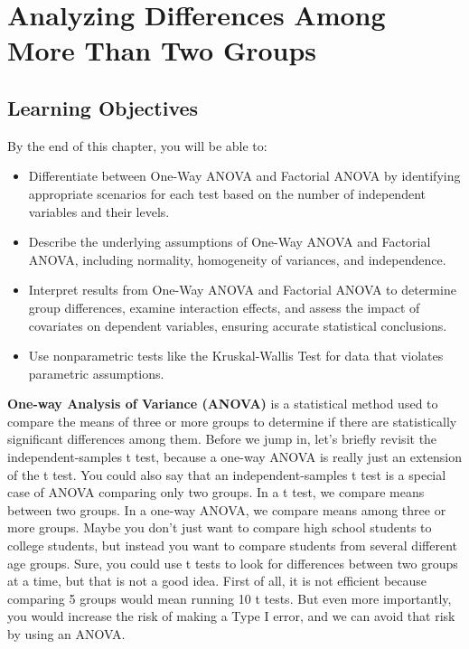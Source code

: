 \documentclass[
  letterpaper,
  DIV=11,
  numbers=noendperiod]{scrreprt}
\begin{document}
\chapter*{Analyzing Differences Among More Than Two
Groups}\label{analyzing-differences-among-more-than-two-groups}


\section*{Learning Objectives}\label{learning-objectives-9}


By the end of this chapter, you will be able to:

\begin{itemize}
\item
  Differentiate between One-Way ANOVA and Factorial ANOVA by identifying
  appropriate scenarios for each test based on the number of independent
  variables and their levels.
\item
  Describe the underlying assumptions of One-Way ANOVA and Factorial
  ANOVA, including normality, homogeneity of variances, and
  independence.
\item
  Interpret results from One-Way ANOVA and Factorial ANOVA to determine
  group differences, examine interaction effects, and assess the impact
  of covariates on dependent variables, ensuring accurate statistical
  conclusions.
\item
  Use nonparametric tests like the Kruskal-Wallis Test for data that
  violates parametric assumptions.
\end{itemize}

\textbf{One-way Analysis of Variance (ANOVA)} is a statistical method
used to compare the means of three or more groups to determine if there
are statistically significant differences among them. Before we jump in,
let's briefly revisit the independent-samples t test, because a one-way
ANOVA is really just an extension of the t test. You could also say that
an independent-samples t test is a special case of ANOVA comparing only
two groups. In a t test, we compare means between two groups. In a
one-way ANOVA, we compare means among three or more groups. Maybe you
don't just want to compare high school students to college students, but
instead you want to compare students from several different age groups.
Sure, you could use t tests to look for differences between two groups
at a time, but that is not a good idea. First of all, it is not
efficient because comparing 5 groups would mean running 10 t tests. But
even more importantly, you would increase the risk of making a Type I
error, and we can avoid that risk by using an ANOVA.\,\,
\end{document}
